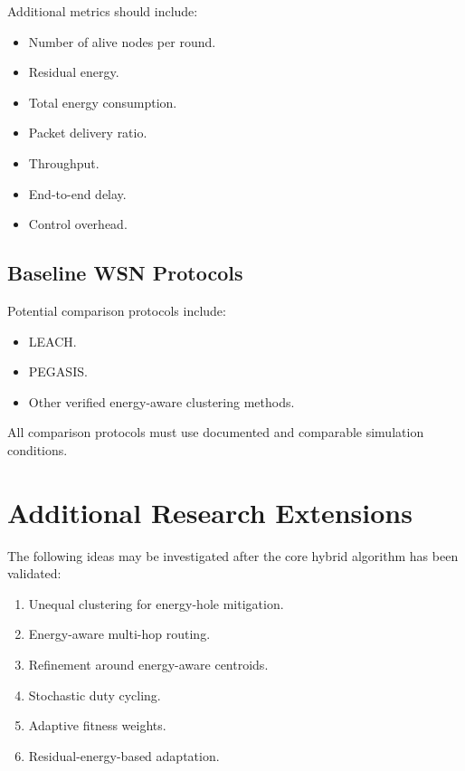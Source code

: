 \documentclass[12pt,a4paper]{report}
\begin{document}
Additional metrics should include:

\begin{itemize}
    \item Number of alive nodes per round.
    \item Residual energy.
    \item Total energy consumption.
    \item Packet delivery ratio.
    \item Throughput.
    \item End-to-end delay.
    \item Control overhead.
\end{itemize}

\section{Baseline WSN Protocols}

Potential comparison protocols include:

\begin{itemize}
    \item LEACH.
    \item PEGASIS.
    \item Other verified energy-aware clustering methods.
\end{itemize}

All comparison protocols must use documented
and comparable simulation conditions.

\chapter{Additional Research Extensions}

The following ideas may be investigated after
the core hybrid algorithm has been validated:

\begin{enumerate}
    \item Unequal clustering for energy-hole mitigation.
    \item Energy-aware multi-hop routing.
    \item Refinement around energy-aware centroids.
    \item Stochastic duty cycling.
    \item Adaptive fitness weights.
    \item Residual-energy-based adaptation.
\end{enumerate}
\end{document}
